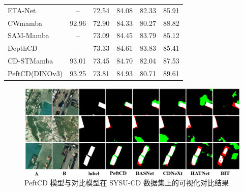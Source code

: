 \begin{table}[!htb]
\begin{tabular}{l c c c c c}
FTA-Net~\cite{t_zhu_fta-net_2025}   & -- & 72.54 & 84.08 & 82.33 & 85.91 \\
CWmamba~\cite{Liu2025CWmambaLC} & 92.96 & 72.90 & 84.33 & 80.27 & 88.82 \\
SAM-Mamba~\cite{Li2025SAMMambaATC}  & -- & 73.09 & 84.45 & 83.79 & 85.12 \\
DepthCD~\cite{Zhou2025DepthCDDP}   & -- & 73.33 & 84.61 & 83.83 & 85.41 \\
CD-STMamba~\cite{Liu2025CDSTMambaTR} & 93.01 & 73.45 & 84.70 & 82.04 & 87.53 \\
\midrule
PeftCD(DINOv3)  & 93.25 & 73.81 & 84.93 & 80.71 & 89.61 \\
\bottomrule
\end{tabular}
\end{table}

\begin{figure}[!htb]
  \centering
  \includegraphics[width=\textwidth]{paper_figures/基于AI基础模型微调的变化检测模型研究/PeftCD/peftcd_sysu.png}
  \caption{PeftCD 模型与对比模型在 SYSU-CD 数据集上的可视化对比结果}
  \label{fig:peftcd_sysu}
\end{figure}


